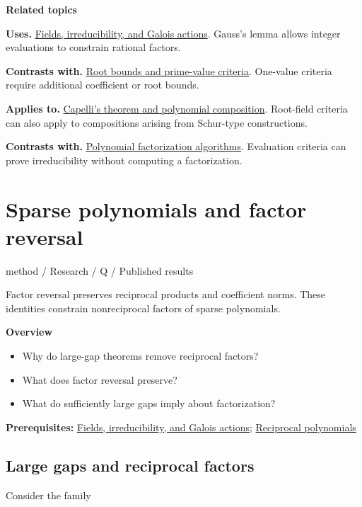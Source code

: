 \documentclass[11pt,a4paper,oneside,openany]{book}
\begin{document}
\par\medskip\begingroup\footnotesize\setlength{\parskip}{1pt}\textbf{\sffamily\color{atlasgreen}Related topics}\par
\color{black}\textbf{Uses.} \hyperlink{article:foundations}{Fields, irreducibility, and Galois actions}. Gauss's lemma allows integer evaluations to constrain rational factors.\par
\color{black}\textbf{Contrasts with.} \hyperlink{article:archimedean-criteria}{Root bounds and prime-value criteria}. One-value criteria require additional coefficient or root bounds.\par
\color{black}\textbf{Applies to.} \hyperlink{article:capelli-composition}{Capelli's theorem and polynomial composition}. Root-field criteria can also apply to compositions arising from Schur-type constructions.\par
\color{black}\textbf{Contrasts with.} \hyperlink{article:factorization-algorithms}{Polynomial factorization algorithms}. Evaluation criteria can prove irreducibility without computing a factorization.\par
\endgroup
\chapter{Sparse polynomials and factor reversal}\label{article:sparse-gaps}\hypertarget{article:sparse-gaps}{}\color{black}
{\sffamily\small\color{atlasgold}method / Research / Q / Published results}\par\medskip
Factor reversal preserves reciprocal products and coefficient norms. These identities constrain nonreciprocal factors of sparse polynomials.\par\medskip
\textbf{Overview}\begin{itemize}
\item Why do large-gap theorems remove reciprocal factors?
\item What does factor reversal preserve?
\item What do sufficiently large gaps imply about factorization?
\end{itemize}
{\small\textbf{Prerequisites:} \hyperlink{article:foundations}{Fields, irreducibility, and Galois actions}; \hyperlink{article:reciprocity}{Reciprocal polynomials}}\par
{}\section{Large gaps and reciprocal factors}
\color{black} Consider the family\par
\end{document}
